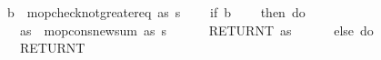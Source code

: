 {\ \ \ \ b\ {\isasymleftarrow}\ mop{\isacharunderscore}{\kern0pt}check{\isacharunderscore}{\kern0pt}not{\isacharunderscore}{\kern0pt}greater{\isacharunderscore}{\kern0pt}eq\ {\isacharparenleft}{\kern0pt}as{\isacharcomma}{\kern0pt}\ s{\isacharparenright}{\kern0pt}{\isacharsemicolon}{\kern0pt}\isanewline
\ \ \ \ if\ b\isanewline
\ \ \ \ then\ do\ {\isacharbraceleft}{\kern0pt}\isanewline
\ \ \ \ \ \ as{\isacharprime}{\kern0pt}\ {\isasymleftarrow}\ mop{\isacharunderscore}{\kern0pt}cons{\isacharunderscore}{\kern0pt}new{\isacharunderscore}{\kern0pt}sum\ {\isacharparenleft}{\kern0pt}as{\isacharcomma}{\kern0pt}\ s{\isacharparenright}{\kern0pt}{\isacharsemicolon}{\kern0pt}\isanewline
\ \ \ \ \ \ RETURNT\ as{\isacharprime}{\kern0pt}\ {\isacharbraceright}{\kern0pt}\ \isanewline
\ \ \ \ else\ do\ {\isacharbraceleft}{\kern0pt}\isanewline
\ \ \ \ \ \ RETURNT\ {\isacharbrackleft}{\kern0pt}{}{\isacharbrackright}{\kern0pt}\ {\isacharbraceright}{\kern0pt}{\isacharbraceright}{\kern0pt}{\isachardoublequoteclose}
}
